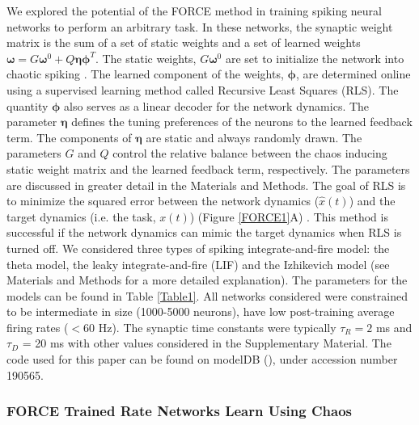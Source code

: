 \documentclass[11pt]{article} %
\begin{document}
We explored the potential of the FORCE method in training spiking neural networks to perform an arbitrary task.  
In these networks, the synaptic weight matrix is the sum of a set of static weights and a 
set of learned weights $\bm \omega = G\bm{\omega}^0+Q\bm \eta \bm \phi^T$.   
The static weights, $G\bm\omega^0$ are set to initialize the network into 
chaotic spiking  \cite{SOMP,OSTOJIC,Harish}.  The learned component of the weights, $\bm \phi$, 
are determined online using a supervised learning method called Recursive Least Squares (RLS).  
The quantity $\bm \phi$ also serves as a linear decoder for the network dynamics.  
The parameter $\bm \eta$ defines the tuning preferences of the neurons to the learned feedback term.  
The components of $\bm\eta$ are static and always randomly drawn.  
The parameters $G$ and $Q$ control the relative balance between the chaos inducing static 
weight matrix and the learned feedback term, respectively.  The parameters are discussed in 
greater detail in the Materials and Methods. The goal of RLS is to minimize the squared error 
between the network dynamics ($\hat{x}(t)$) and the target dynamics (i.e. the task, $x(t)$) 
(Figure \ref{FORCE1}A) \cite{haykin,bishop}.  
This method is successful if the network dynamics can mimic the target dynamics when RLS is turned off.   
We considered three types of spiking integrate-and-fire model: the theta model, the leaky 
integrate-and-fire (LIF) and the Izhikevich model (see Materials and Methods for a more detailed explanation).  
The parameters for the models can be found in Table \ref{Table1}.  
All networks considered were constrained to be intermediate in size (1000-5000 neurons), 
have low post-training average firing rates ($<60$ Hz).  
The synaptic time constants were typically $\tau_R = 2$ ms and $\tau_D$ = 20 ms with other values 
considered in the Supplementary Material.   
The code used for this paper can be found on modelDB (\cite{modeldb}), under accession number 190565.


\subsubsection*{FORCE Trained Rate Networks Learn Using Chaos} 
\end{document}
